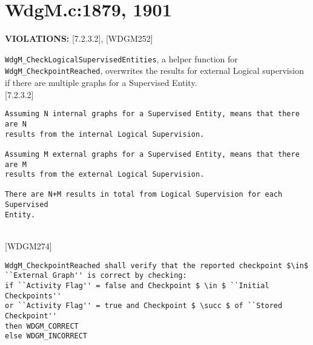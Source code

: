 \documentclass[11pt,a4paper]{article}
\begin{document}
\section{WdgM.c:1879, 1901}
\textbf{VIOLATIONS:} [7.2.3.2], [WDGM252]\\[0.5cm]

\lstset{language=autosar}

\lstinline!WdgM_CheckLogicalSupervisedEntities!, a helper function for
\lstinline!WdgM_CheckpointReached!, overwrites the results for external Logical
supervision if there are multiple graphs for a Supervised Entity.\\

[7.2.3.2]
\begin{lstlisting}
Assuming N internal graphs for a Supervised Entity, means that there are N
results from the internal Logical Supervision.

Assuming M external graphs for a Supervised Entity, means that there are M
results from the external Logical Supervision.

There are N+M results in total from Logical Supervision for each Supervised
Entity.
\end{lstlisting}~\\

[WDGM274]
\begin{lstlisting}[mathescape]
WdgM_CheckpointReached shall verify that the reported checkpoint $\in$
``External Graph'' is correct by checking:
if ``Activity Flag'' = false and Checkpoint $ \in $ ``Initial Checkpoints''
or ``Activity Flag'' = true and Checkpoint $ \succ $ of ``Stored Checkpoint''
then WDGM_CORRECT
else WDGM_INCORRECT
\end{lstlisting}~\\

\lstset{language=c}
\end{document}

